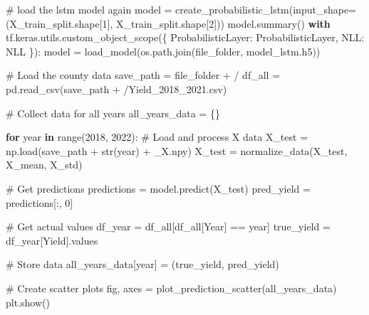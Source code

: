 \documentclass[
  letterpaper,
  DIV=11,
  numbers=noendperiod]{scrreprt}
\newenvironment{Shaded}{\begin{snugshade}}{\end{snugshade}}
\newcommand{\BuiltInTok}[1]{\textcolor[rgb]{0.00,0.23,0.31}{#1}}
\newcommand{\CommentTok}[1]{\textcolor[rgb]{0.37,0.37,0.37}{#1}}
\newcommand{\ControlFlowTok}[1]{\textcolor[rgb]{0.00,0.23,0.31}{\textbf{#1}}}
\newcommand{\DecValTok}[1]{\textcolor[rgb]{0.68,0.00,0.00}{#1}}
\newcommand{\KeywordTok}[1]{\textcolor[rgb]{0.00,0.23,0.31}{\textbf{#1}}}
\newcommand{\NormalTok}[1]{\textcolor[rgb]{0.00,0.23,0.31}{#1}}
\newcommand{\OperatorTok}[1]{\textcolor[rgb]{0.37,0.37,0.37}{#1}}
\newcommand{\StringTok}[1]{\textcolor[rgb]{0.13,0.47,0.30}{#1}}
\begin{document}
\begin{Shaded}
\begin{Highlighting}[]
\CommentTok{\# load the lstm model again}
\NormalTok{model }\OperatorTok{=}\NormalTok{ create\_probabilistic\_lstm(input\_shape}\OperatorTok{=}\NormalTok{(X\_train\_split.shape[}\DecValTok{1}\NormalTok{], X\_train\_split.shape[}\DecValTok{2}\NormalTok{]))}
\NormalTok{model.summary()}
\ControlFlowTok{with}\NormalTok{ tf.keras.utils.custom\_object\_scope(\{}
    \StringTok{\textquotesingle{}ProbabilisticLayer\textquotesingle{}}\NormalTok{: ProbabilisticLayer,}
    \StringTok{\textquotesingle{}NLL\textquotesingle{}}\NormalTok{: NLL}
\NormalTok{\}):}
\NormalTok{    model }\OperatorTok{=}\NormalTok{ load\_model(os.path.join(file\_folder, }\StringTok{\textquotesingle{}model\_lstm.h5\textquotesingle{}}\NormalTok{))}

\CommentTok{\# Load the county data}
\NormalTok{save\_path }\OperatorTok{=}\NormalTok{ file\_folder }\OperatorTok{+} \StringTok{\textquotesingle{}/\textquotesingle{}}
\NormalTok{df\_all }\OperatorTok{=}\NormalTok{ pd.read\_csv(save\_path }\OperatorTok{+} \StringTok{\textquotesingle{}/Yield\_2018\_2021.csv\textquotesingle{}}\NormalTok{)}

\CommentTok{\# Collect data for all years}
\NormalTok{all\_years\_data }\OperatorTok{=}\NormalTok{ \{\}}

\ControlFlowTok{for}\NormalTok{ year }\KeywordTok{in} \BuiltInTok{range}\NormalTok{(}\DecValTok{2018}\NormalTok{, }\DecValTok{2022}\NormalTok{):}
    \CommentTok{\# Load and process X data}
\NormalTok{    X\_test }\OperatorTok{=}\NormalTok{ np.load(save\_path }\OperatorTok{+} \BuiltInTok{str}\NormalTok{(year) }\OperatorTok{+} \StringTok{\textquotesingle{}\_X.npy\textquotesingle{}}\NormalTok{)}
\NormalTok{    X\_test }\OperatorTok{=}\NormalTok{ normalize\_data(X\_test, X\_mean, X\_std)}

    \CommentTok{\# Get predictions}
\NormalTok{    predictions }\OperatorTok{=}\NormalTok{ model.predict(X\_test)}
\NormalTok{    pred\_yield }\OperatorTok{=}\NormalTok{ predictions[:, }\DecValTok{0}\NormalTok{]}

    \CommentTok{\# Get actual values}
\NormalTok{    df\_year }\OperatorTok{=}\NormalTok{ df\_all[df\_all[}\StringTok{\textquotesingle{}Year\textquotesingle{}}\NormalTok{] }\OperatorTok{==}\NormalTok{ year]}
\NormalTok{    true\_yield }\OperatorTok{=}\NormalTok{ df\_year[}\StringTok{\textquotesingle{}Yield\textquotesingle{}}\NormalTok{].values}

    \CommentTok{\# Store data}
\NormalTok{    all\_years\_data[year] }\OperatorTok{=}\NormalTok{ (true\_yield, pred\_yield)}

\CommentTok{\# Create scatter plots}
\NormalTok{fig, axes }\OperatorTok{=}\NormalTok{ plot\_prediction\_scatter(all\_years\_data)}
\NormalTok{plt.show()}
\end{Highlighting}
\end{Shaded}
\end{document}
